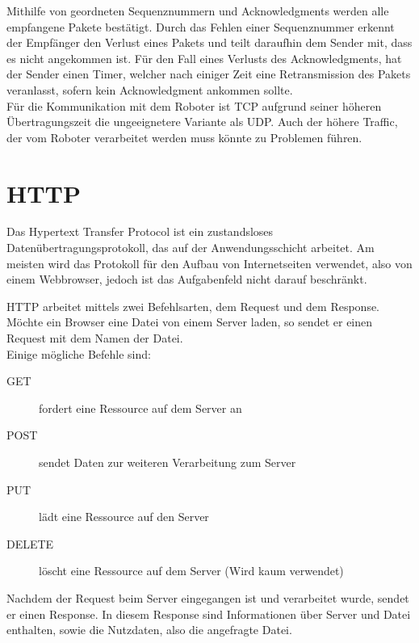 Mithilfe von geordneten Sequenznummern und Acknowledgments werden alle empfangene Pakete bestätigt. Durch das Fehlen einer Sequenznummer erkennt der Empfänger den Verlust eines Pakets und teilt daraufhin dem Sender mit, dass es nicht angekommen ist. Für den Fall eines Verlusts des Acknowledgments, hat der Sender einen Timer, welcher nach einiger Zeit eine Retransmission des Pakets veranlasst, sofern kein Acknowledgment ankommen sollte. \\

Für die Kommunikation mit dem Roboter ist TCP aufgrund seiner höheren Übertragungszeit die ungeeignetere Variante als UDP. Auch der höhere Traffic, der vom Roboter verarbeitet werden muss könnte zu Problemen führen.


\section{HTTP}
Das Hypertext Transfer Protocol ist ein zustandsloses Datenübertragungsprotokoll, das auf der Anwendungsschicht arbeitet. Am meisten wird das Protokoll für den Aufbau von Internetseiten verwendet, also von einem Webbrowser, jedoch ist das Aufgabenfeld nicht darauf beschränkt.

HTTP arbeitet mittels zwei Befehlsarten, dem Request und dem Response. Möchte ein Browser eine Datei von einem Server laden, so sendet er einen Request mit dem Namen der Datei. \\
Einige mögliche Befehle sind: 
\begin{description}
	\item[GET] fordert eine Ressource auf dem Server an
	\item[POST] sendet Daten zur weiteren Verarbeitung zum Server
	\item[PUT] lädt eine Ressource auf den Server
	\item[DELETE] löscht eine Ressource auf dem Server (Wird kaum verwendet)
\end{description} Nachdem der Request beim Server eingegangen ist und verarbeitet wurde, sendet er einen Response. In diesem Response sind Informationen über Server und Datei enthalten, sowie die Nutzdaten, also die angefragte Datei. 



